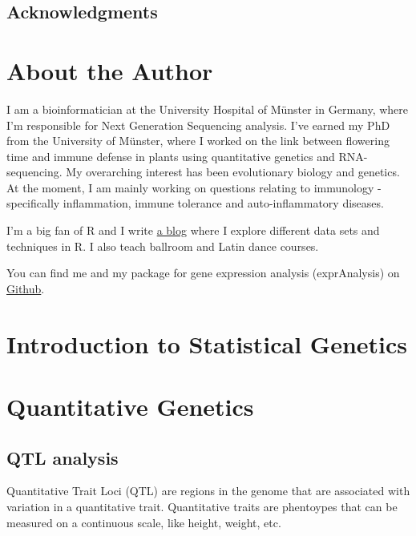 \documentclass[12pt,]{book}
\theoremstyle{definition}
\theoremstyle{definition}
\theoremstyle{remark}
\begin{document}
\section*{Acknowledgments}\label{acknowledgments}

\chapter*{About the Author}\label{about-the-author}

I am a bioinformatician at the University Hospital of Münster in
Germany, where I'm responsible for Next Generation Sequencing analysis.
I've earned my PhD from the University of Münster, where I worked on the
link between flowering time and immune defense in plants using
quantitative genetics and RNA-sequencing. My overarching interest has
been evolutionary biology and genetics. At the moment, I am mainly
working on questions relating to immunology - specifically inflammation,
immune tolerance and auto-inflammatory diseases.

I'm a big fan of R and I write \href{https://shiring.github.io/}{a blog}
where I explore different data sets and techniques in R. I also teach
ballroom and Latin dance courses.

You can find me and my package for gene expression analysis
(exprAnalysis) on \href{https://github.com/ShirinG}{Github}.

\chapter{Introduction to Statistical
Genetics}\label{introduction-to-statistical-genetics}

\chapter{Quantitative Genetics}\label{quantitative-genetics}

\section{QTL analysis}\label{qtl-analysis}

Quantitative Trait Loci (QTL) are regions in the genome that are
associated with variation in a quantitative trait. Quantitative traits
are phentoypes that can be measured on a continuous scale, like height,
weight, etc.
\end{document}
